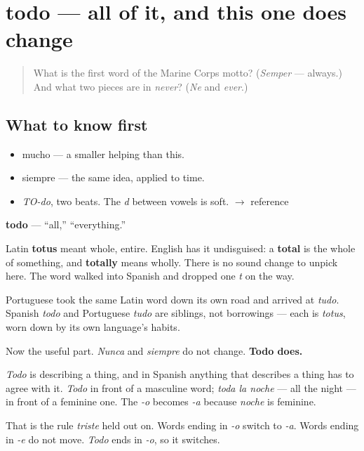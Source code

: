 \section[todo]{todo — all of it, and this one does change}

\label{lesson:ES-C316-todo}



\begin{quote}
What is the first word of the Marine Corps motto? (\emph{Semper} — always.) And what two pieces are in \emph{never}? (\emph{Ne} and \emph{ever}.)
\end{quote}

\subsection*{What to know first}
\begin{itemize}
\raggedright
  \item mucho — a smaller helping than this.
  \item siempre — the same idea, applied to time.
\end{itemize}

\begin{sounds}
\begin{itemize}
\raggedright
  \item \emph{TO-do}, two beats. The \emph{d} between vowels is soft. $\to$ reference
\end{itemize}
\end{sounds}

\begin{cousinweb}
\textbf{todo} — \textquotedblleft{}all,\textquotedblright{} \textquotedblleft{}everything.\textquotedblright{}

Latin \textbf{totus} meant whole, entire. English has it undisguised: a \textbf{total} is the whole of something, and \textbf{totally} means wholly. There is no sound change to unpick here. The word walked into Spanish and dropped one \emph{t} on the way.

Portuguese took the same Latin word down its own road and arrived at \emph{tudo}. Spanish \emph{todo} and Portuguese \emph{tudo} are siblings, not borrowings — each is \emph{totus}, worn down by its own language's habits.

Now the useful part. \emph{Nunca} and \emph{siempre} do not change. \textbf{Todo does.}

\emph{Todo} is describing a thing, and in Spanish anything that describes a thing has to agree with it. \emph{Todo} in front of a masculine word; \emph{toda la noche} — all the night — in front of a feminine one. The \emph{-o} becomes \emph{-a} because \emph{noche} is feminine.

That is the rule \emph{triste} held out on. Words ending in \emph{-o} switch to \emph{-a}. Words ending in \emph{-e} do not move. \emph{Todo} ends in \emph{-o}, so it switches.
\end{cousinweb}

